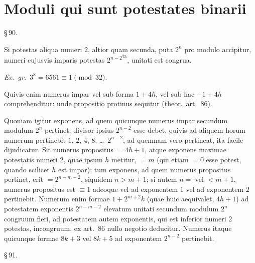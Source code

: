 \documentclass[12pt,a4paper]{article}
\theoremstyle{plain}
\theoremstyle{definition}
\theoremstyle{remark}
\begin{document}
\section*{Moduli qui sunt potestates binarii}

\begin{center}\S\,90.\end{center}

Si potestas aliqua numeri $2$, altior quam secunda, puta $2^n$ pro modulo accipitur, numeri cujusvis imparis potestas ${2^{n-2}}^\text{ta}$, unitati est congrua.

\textit{Ex.\ gr.}\ $3^8 = 6561 \equiv 1 \pmod{32}$.

Quivis enim numerus impar vel sub forma $1 + 4h$, vel sub hac $-1 + 4h$ comprehenditur: unde propositio protinus sequitur (theor.\ art.~86).

Quoniam igitur exponens, ad quem quicunque numerus impar secundum modulum $2^n$ pertinet, divisor ipsius $2^{n-2}$ esse debet, quivis ad aliquem horum numerum pertinebit $1$, $2$, $4$, $8$, \dots\ $2^{n-2}$, ad quemnam vero pertineat, ita facile dijudicatur. Sit numerus propositus $= 4h + 1$, atque exponens maximae potestatis numeri $2$, quae ipsum $h$ metitur, $= m$ (qui etiam $= 0$ esse potest, quando scilicet $h$ est impar); tum exponens, ad quem numerus propositus pertinet, erit $= 2^{n-m-2}$, siquidem $n > m + 1$; si autem $n = $ vel $< m + 1$, numerus propositus est $\equiv 1$ adeoque vel ad exponentem $1$ vel ad exponentem $2$ pertinebit. Numerum enim formae $1 + 2^{m+2}k$ (quae huic aequivalet, $4h+1$) ad potestatem exponentis $2^{n-m-2}$ elevatum unitati secundum modulum $2^n$ congruum fieri, ad potestatem autem exponentis, qui est inferior numeri $2$ potestas, incongruum, ex art.~86 nullo negotio deducitur. Numerus itaque quicunque formae $8k+3$ vel $8k+5$ ad exponentem $2^{n-2}$ pertinebit.

\begin{center}\S\,91.\end{center}
\end{document}
